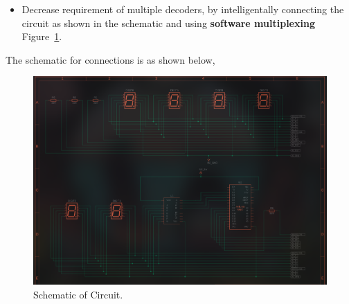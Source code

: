 \documentclass[a4paper,12pt]{article}
\begin{document}
\begin{itemize}
  \item Decrease requirement of multiple decoders, by intelligentally connecting the circuit as shown in the schematic and using \textbf{software multiplexing}
    Figure~\ref{fig:circuit_schematic}.
\end{itemize}
The schematic for connections is as shown below,
\begin{figure}[H]
    \centering
    \includegraphics[width=\textwidth]{figs/circuit_schematic.png}
    \caption{Schematic of Circuit.}
    \label{fig:circuit_schematic}
\end{figure}
\end{document}
